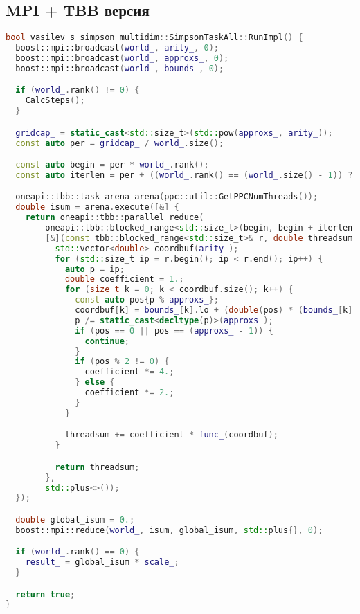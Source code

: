 \documentclass[14pt,a4paper]{extarticle}
\begin{document}
\subsection{MPI + TBB версия}
\begin{lstlisting}[language=C++]
bool vasilev_s_simpson_multidim::SimpsonTaskAll::RunImpl() {
  boost::mpi::broadcast(world_, arity_, 0);
  boost::mpi::broadcast(world_, approxs_, 0);
  boost::mpi::broadcast(world_, bounds_, 0);

  if (world_.rank() != 0) {
    CalcSteps();
  }

  gridcap_ = static_cast<std::size_t>(std::pow(approxs_, arity_));
  const auto per = gridcap_ / world_.size();

  const auto begin = per * world_.rank();
  const auto iterlen = per + ((world_.rank() == (world_.size() - 1)) ? (gridcap_ % world_.size()) : 0);

  oneapi::tbb::task_arena arena(ppc::util::GetPPCNumThreads());
  double isum = arena.execute([&] {
    return oneapi::tbb::parallel_reduce(
        oneapi::tbb::blocked_range<std::size_t>(begin, begin + iterlen, iterlen / arena.max_concurrency()), 0.,
        [&](const tbb::blocked_range<std::size_t>& r, double threadsum) {
          std::vector<double> coordbuf(arity_);
          for (std::size_t ip = r.begin(); ip < r.end(); ip++) {
            auto p = ip;
            double coefficient = 1.;
            for (size_t k = 0; k < coordbuf.size(); k++) {
              const auto pos{p % approxs_};
              coordbuf[k] = bounds_[k].lo + (double(pos) * (bounds_[k].hi - bounds_[k].lo) / double(approxs_));
              p /= static_cast<decltype(p)>(approxs_);
              if (pos == 0 || pos == (approxs_ - 1)) {
                continue;
              }
              if (pos % 2 != 0) {
                coefficient *= 4.;
              } else {
                coefficient *= 2.;
              }
            }

            threadsum += coefficient * func_(coordbuf);
          }

          return threadsum;
        },
        std::plus<>());
  });

  double global_isum = 0.;
  boost::mpi::reduce(world_, isum, global_isum, std::plus{}, 0);

  if (world_.rank() == 0) {
    result_ = global_isum * scale_;
  }

  return true;
}
\end{lstlisting}
\end{document}
